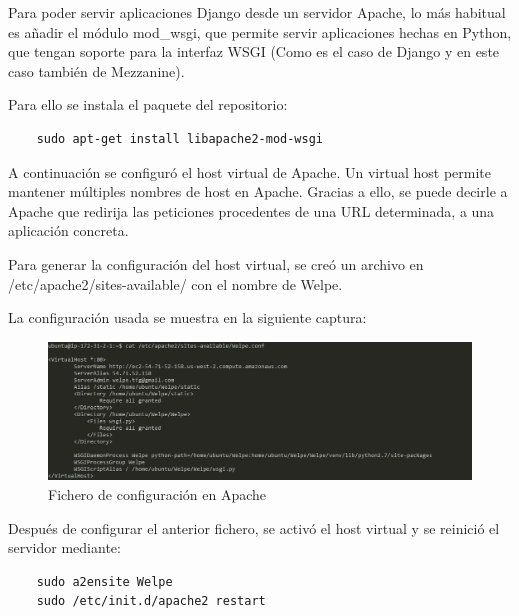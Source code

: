 Para poder servir aplicaciones Django desde un servidor Apache, lo más habitual es añadir el módulo mod\_wsgi, que permite servir aplicaciones hechas en Python, que tengan soporte para la interfaz WSGI (Como es el caso de Django y en este caso también de Mezzanine).


Para ello se instala el paquete del repositorio:
\begin{verbatim}
	sudo apt-get install libapache2-mod-wsgi
\end{verbatim}

A continuación se configuró el host virtual de Apache. Un virtual host permite mantener múltiples nombres de host en Apache. Gracias a ello, se puede decirle a Apache que redirija las peticiones procedentes de una URL determinada, a una aplicación concreta.

Para generar la configuración del host virtual, se creó un archivo en /etc/apache2/sites-available/ con el nombre de Welpe.

La configuración usada se muestra en la siguiente captura:

\begin{figure}[H]
   \centering
   \includegraphics[width=12cm]{img/welpe_conf}
   \caption{Fichero de configuración en Apache}
   \label{figura:welpe_conf}
\end{figure}

Después de configurar el anterior fichero, se activó el host virtual y se reinició el servidor mediante:
\begin{verbatim}
	sudo a2ensite Welpe
	sudo /etc/init.d/apache2 restart
\end{verbatim}


